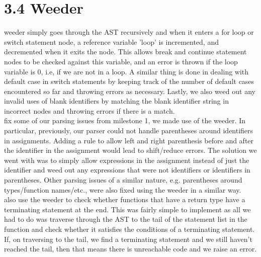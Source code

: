 \documentclass{article}
\begin{document}
\section*{3.4 Weeder}\mbox{}
 weeder simply goes through the AST recursively and when it enters a for loop or switch statement node, a reference variable 'loop' is incremented, and decremented when it exits the node.
This allows break and continue statement nodes to be checked against this variable, and an error is thrown if the loop variable is 0, i.e, if we are not in a loop.
A similar thing is done in dealing with default case in switch statements by keeping track of the number of default cases encountered so far and throwing errors as necessary.
Lastly, we also weed out any invalid uses of blank identifiers by matching the blank identifier string in incorrect nodes and throwing errors if there is a match.\\
 fix some of our parsing issues from milestone 1, we made use of the weeder.
In particular, previously, our parser could not handle parentheses around identifiers in assignments.
Adding a rule to allow left and right parenthesis before and after the identifier in the assignment would lead to shift/reduce errors.
The solution we went with was to simply allow expressions in the assignment instead of just the identifier and weed out any expressions that were not identifiers or identifiers in parentheses.
Other parsing issues of a similar nature, e.g. parentheses around types/function names/etc., were also fixed using the weeder in a similar way. \\
 also use the weeder to check whether functions that have a return type have a terminating statement at the end.
This was fairly simple to implement as all we had to do was traverse through the AST to the tail of the statement list in the function and check whether it satisfies the conditions of a terminating statement.
If, on traversing to the tail, we find a terminating statement and we still haven't reached the tail, then that means there is unreachable code and we raise an error.
\end{document}
